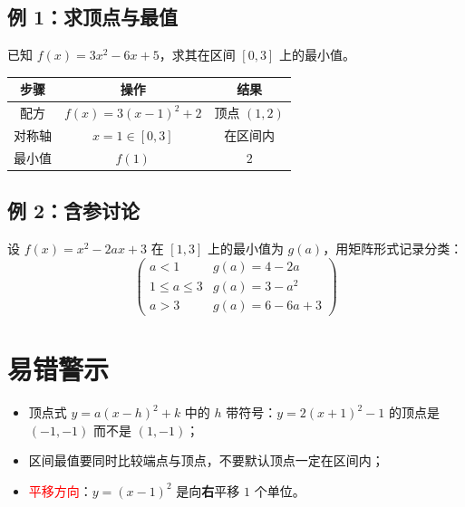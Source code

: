 \documentclass[UTF8]{ctexart}
\begin{document}
\subsection{例 1：求顶点与最值}

已知 $f(x)=3x^2-6x+5$，求其在区间 $[0,3]$ 上的最小值。

\begin{center}
\begin{tabular}{|c|c|c|}
  \hline
  \textbf{步骤} & \textbf{操作} & \textbf{结果} \\
  \hline
  配方 & $f(x)=3(x-1)^2+2$ & 顶点 $(1,2)$ \\
  \hline
  对称轴 & $x=1 \in [0,3]$ & 在区间内 \\
  \hline
  最小值 & $f(1)$ & $2$ \\
  \hline
\end{tabular}
\end{center}

\subsection{例 2：含参讨论}

设 $f(x)=x^2-2ax+3$ 在 $[1,3]$ 上的最小值为 $g(a)$，用矩阵形式记录分类：
\[
  \begin{pmatrix}
    a<1 & g(a)=4-2a \\
    1\le a\le 3 & g(a)=3-a^2 \\
    a>3 & g(a)=6-6a+3
  \end{pmatrix}
\]

\section{易错警示}

\begin{itemize}
  \item 顶点式 $y=a(x-h)^2+k$ 中的 $h$ 带符号：$y=2(x+1)^2-1$ 的顶点是 $(-1,-1)$ 而不是 $(1,-1)$；
  \item 区间最值要同时比较端点与顶点，不要默认顶点一定在区间内；
  \item \textcolor{red}{平移方向}：$y=(x-1)^2$ 是向\textbf{右}平移 $1$ 个单位。
\end{itemize}
\end{document}
